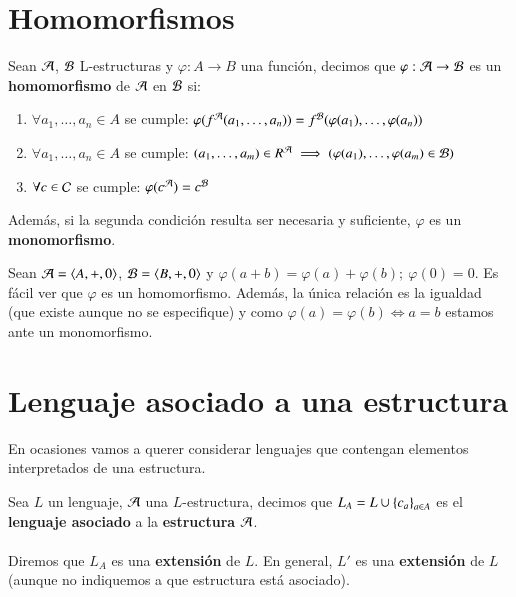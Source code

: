 \section{Homomorfismos}
\begin{dfn}
    Sean $\mathcal{A}$, $\mathcal{B}$ L-estructuras y $\varphi: A \to B$ una función, decimos que $\varphi: \mathcal{A} \to \mathcal{B}$ es un \textbf{homomorfismo} de $\mathcal{A}$ en $\mathcal{B}$ si:
    \begin{enumerate}
        \item $\forall a_1, \ldots, a_n \in A$ se cumple: $\varphi(f^{\mathcal{A}}(a_1, \ldots, a_n)) = f^{\mathcal{B}}(\varphi(a_1), \ldots, \varphi(a_n))$
        \item $\forall a_1, \ldots, a_n \in A$ se cumple: $(a_1, \ldots, a_m) \in R^{\mathcal{A}} \implies (\varphi(a_1), \ldots, \varphi(a_m) \in \mathcal{B})$
        \item $\forall c \in \mathcal{C}$ se cumple: $\varphi(c^{\mathcal{A}}) = c^{\mathcal{B}}$
    \end{enumerate}
    Además, si la segunda condición resulta ser necesaria y suficiente, $\varphi$ es un \textbf{monomorfismo}.
\end{dfn}
\begin{eg}
    Sean $\mathcal{A} = \langle A, +, 0\rangle$, $\mathcal{B} = \langle B, +, 0\rangle$ y $\varphi(a+b) = \varphi(a) + \varphi(b);\ \varphi(0)=0$. Es fácil ver que $\varphi$ es un homomorfismo. Además, la única relación es la igualdad (que existe aunque no se especifique) y como $\varphi(a) = \varphi(b) \iff a = b$ estamos ante un monomorfismo.
\end{eg}

\section{Lenguaje asociado a una estructura}

En ocasiones vamos a querer considerar lenguajes que contengan elementos interpretados de una estructura.

\begin{dfn}
    Sea $L$ un lenguaje, $\mathcal{A}$ una $L$-estructura, decimos que $L_{A} = L \cup \left\{c_a\right\}_{a \in A} $ es el \textbf{lenguaje asociado} a la \textbf{estructura} $\mathcal{A}$.\\\\
    Diremos que $L_A$ es una \textbf{extensión} de $L$. En general, $L'$ es una \textbf{extensión} de $L$ (aunque no indiquemos a que estructura está asociado).
\end{dfn}

